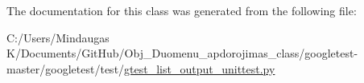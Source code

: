 The documentation for this class was generated from the following file\+:\begin{DoxyCompactItemize}
\item 
C\+:/\+Users/\+Mindaugas K/\+Documents/\+Git\+Hub/\+Obj\+\_\+\+Duomenu\+\_\+apdorojimas\+\_\+class/googletest-\/master/googletest/test/\mbox{\hyperlink{googletest-master_2googletest_2test_2gtest__list__output__unittest_8py}{gtest\+\_\+list\+\_\+output\+\_\+unittest.\+py}}\end{DoxyCompactItemize}
